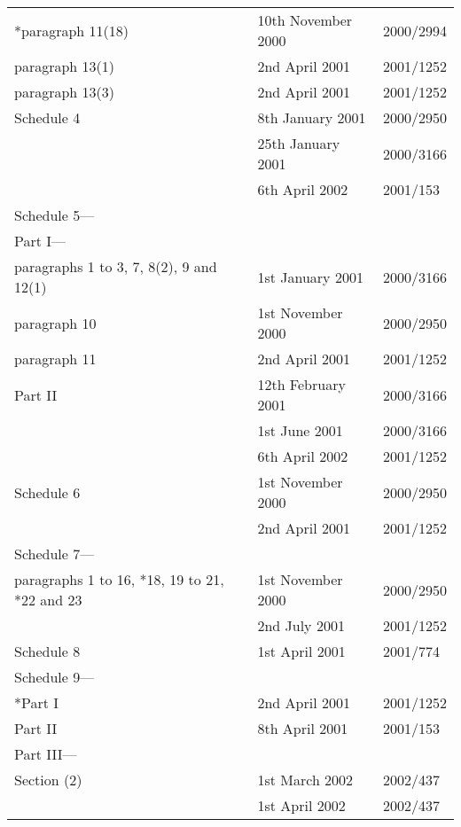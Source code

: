 \documentclass[12pt,a4paper]{article}
\begin{document}
{\begin{longtable}{p{194.81242pt}p{92.22098pt}p{43.81pt}}
\hspace{1em}{}*paragraph 11(18)	&10th November 2000	&2000/2994\\
\hspace{1em}paragraph 13(1)	&2nd April 2001	&2001/1252\\
\hspace{1em}paragraph 13(3)	&2nd April 2001	&2001/1252\\
Schedule 4	&8th January 2001	&2000/2950\\
	&25th January 2001	&2000/3166\\
	&6th April 2002	&2001/153\\
Schedule 5—	\\	
\hspace{1em}Part I—		\\
\hspace{2em}paragraphs 1 to 3, 7, 8(2), 9 and 12(1)	&1st January 2001	&2000/3166\\
\hspace{2em}paragraph 10	&1st November 2000	&2000/2950\\
\hspace{2em}paragraph 11	&2nd April 2001	&2001/1252\\
\hspace{1em}Part II	&12th February 2001	&2000/3166\\
	&1st June 2001	&2000/3166\\
	&6th April 2002	&2001/1252\\
Schedule 6	&1st November 2000	&2000/2950\\
	&2nd April 2001	&2001/1252\\
Schedule 7—		\\
\hspace{1em}paragraphs 1 to 16, *18, 19 to 21, *22 and 23	&1st November 2000	&2000/2950\\
	&2nd July 2001	&2001/1252\\
Schedule 8	&1st April 2001	&2001/774\\
Schedule 9—		\\
\hspace{1em}*Part I	&2nd April 2001	&2001/1252\\
\hspace{1em}Part II	&8th April 2001	&2001/153\\
\hspace{1em}Part III—		\\
\hspace{2em}Section (2)	&1st March 2002	&2002/437\\
	&1st April 2002	&2002/437\\

\end{longtable}}
\end{document}
